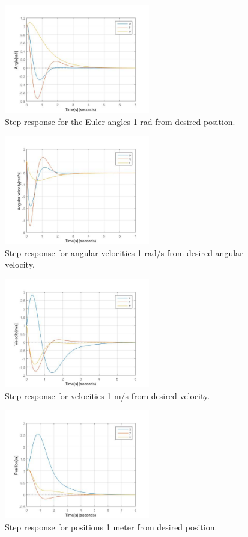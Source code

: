 \documentclass[journal, twoside]{IEEEtran}
\begin{document}
	
		\begin{figure}[H]
  			\centering
  			\includegraphics[width=2.5in]{Results/Controll/Fig1}
  			\caption{Step response for the Euler angles 1 rad from desired position.}
  			\label{fig:contresangles}
		\end{figure}	
		
		\begin{figure}[H]
  			\centering
  			\includegraphics[width=2.5in]{Results/Controll/Fig2}
  			\caption{Step response for angular velocities 1 rad/s from desired angular velocity.}
  			\label{fig:contresangvel}
		\end{figure}	

		\begin{figure}[H]
  			\centering
  			\includegraphics[width=2.5in]{Results/Controll/Fig3}
  			\caption{Step response for velocities 1 m/s from desired velocity.}
  			\label{fig:contresvel}
		\end{figure}	
		
		\begin{figure}[H]
  			\centering
  			\includegraphics[width=2.5in]{Results/Controll/Fig4}
  			\caption{Step response for positions 1 meter from desired position.}
  			\label{fig:contrespos}
		\end{figure}	
\end{document}
